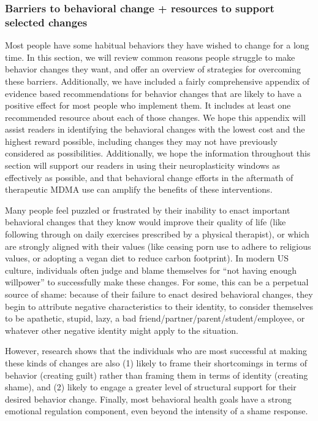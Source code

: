 \documentclass[12pt,letterpaper]{article}
\begin{document}
\subsubsection*{Barriers to behavioral change + resources to support selected changes}

Most people have some habitual behaviors they have wished to change for a long time. In this section, we will review common reasons people struggle to make behavior changes they want, and offer an overview of strategies for overcoming these barriers. Additionally, we have included a fairly comprehensive appendix of evidence based recommendations for behavior changes that are likely to have a positive effect for most people who implement them. It includes at least one recommended resource about each of those changes. We hope this appendix will assist readers in identifying the behavioral changes with the lowest cost and the highest reward possible, including changes they may not have previously considered as possibilities. Additionally, we hope the information throughout this section will support our readers in using their neuroplasticity windows as effectively as possible, and that behavioral change efforts in the aftermath of therapeutic MDMA use can amplify the benefits of these interventions.

Many people feel puzzled or frustrated by their inability to enact important behavioral changes that they know would improve their quality of life (like following through on daily exercises prescribed by a physical therapist), or which are strongly aligned with their values (like ceasing porn use to adhere to religious values, or adopting a vegan diet to reduce carbon footprint). In modern US culture, individuals often judge and blame themselves for “not having enough willpower” to successfully make these changes. For some, this can be a perpetual source of shame: because of their failure to enact desired behavioral changes, they begin to attribute negative characteristics to their identity, to consider themselves to be apathetic, stupid, lazy, a bad friend/partner/parent/student/employee, or whatever other negative identity might apply to the situation.

However, research shows that the individuals who are most successful at making these kinds of changes are also (1) likely to frame their shortcomings in terms of behavior (creating guilt) rather than framing them in terms of identity (creating shame), and (2) likely to engage a greater level of structural support for their desired behavior change. Finally, most behavioral health goals have a strong emotional regulation component, even beyond the intensity of a shame response.
\end{document}
